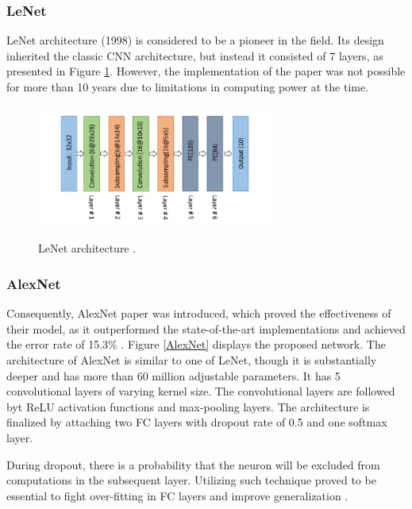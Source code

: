 \documentclass[english, 12pt, a4paper, elec, utf8, a-1b, online]{aaltothesis}
\begin{document}
\subsubsection{LeNet}
LeNet architecture (1998) \cite{lecun-gradientbased-learning-applied-1998} is considered to be a pioneer in the field. Its design inherited the classic CNN architecture, but instead it consisted of 7 layers, as presented in Figure \ref{LeNet}. However, the implementation of the paper was not possible for more than 10 years due to limitations in computing power at the time. 

\begin{figure}[htb]
	\begin{center}
		\includegraphics[height=4cm]{./LeNet.png}
	\end{center}
	\caption{LeNet architecture \cite{alom01}.}
	\begin{center}
		\label{LeNet}
	\end{center}
\end{figure}
\FloatBarrier

\subsubsection{AlexNet}
\label{alexnet_section} 
Consequently, AlexNet paper was introduced, which proved the effectiveness of their model, as it outperformed the state-of-the-art implementations and achieved the error rate of 15.3\% \cite{NIPS2012_c399862d}. Figure \ref{AlexNet} displays the proposed network. The architecture of AlexNet is similar to one of LeNet, though it is substantially deeper and has more than 60 million adjustable parameters. It has 5 convolutional layers of varying kernel size. The convolutional layers are followed byt ReLU activation functions and max-pooling layers. The architecture is finalized by attaching two FC layers with dropout rate of 0.5 and one softmax layer.

During dropout, there is a probability that the neuron will be excluded from computations in the subsequent layer. Utilizing such technique proved to be essential to fight over-fitting in FC layers and improve generalization  \cite{JMLR:v15:srivastava14a}. 
\end{document}
